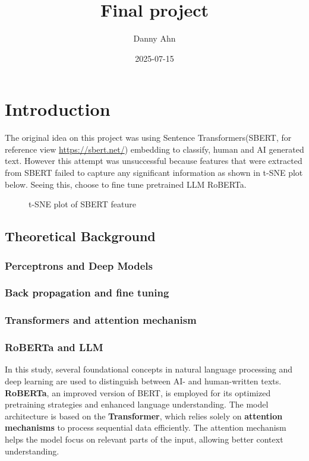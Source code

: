 \documentclass[
]{article}
\title{Final project}
\author{Danny Ahn}
\date{2025-07-15}
\makeatletter
\newcommand*\pandocbounded[1]{%
  \sbox\pandoc@box{#1}%
  \Gscale@div\@tempa{\textheight}{\dimexpr\ht\pandoc@box+\dp\pandoc@box\relax}%
  \Gscale@div\@tempb{\linewidth}{\wd\pandoc@box}%
  \ifdim\@tempb\p@<\@tempa\p@\let\@tempa\@tempb\fi%
  \ifdim\@tempa\p@<\p@\scalebox{\@tempa}{\usebox\pandoc@box}%
  \else\usebox{\pandoc@box}%
  \fi%
}
\makeatother
\begin{document}
\maketitle

\section{Introduction}\label{introduction}

The original idea on this project was using Sentence Transformers(SBERT,
for reference view \url{https://sbert.net/}) embedding to classify,
human and AI generated text. However this attempt was unsuccessful
because features that were extracted from SBERT failed to capture any
significant information as shown in t-SNE plot below. Seeing this,
choose to fine tune pretrained LLM RoBERTa.

\begin{figure}
\centering
\pandocbounded{\texttt{[image: images/TSNE\_plot.png]}}
\caption{t-SNE plot of SBERT feature}
\end{figure}

\subsection{Theoretical Background}\label{theoretical-background}

\subsubsection{Perceptrons and Deep
Models}\label{perceptrons-and-deep-models}

\subsubsection{Back propagation and fine
tuning}\label{back-propagation-and-fine-tuning}

\subsubsection{Transformers and attention
mechanism}\label{transformers-and-attention-mechanism}

\subsubsection{RoBERTa and LLM}\label{roberta-and-llm}

In this study, several foundational concepts in natural language
processing and deep learning are used to distinguish between AI- and
human-written texts. \textbf{RoBERTa}, an improved version of BERT, is
employed for its optimized pretraining strategies and enhanced language
understanding. The model architecture is based on the
\textbf{Transformer}, which relies solely on \textbf{attention
mechanisms} to process sequential data efficiently. The attention
mechanism helps the model focus on relevant parts of the input, allowing
better context understanding.
\end{document}
